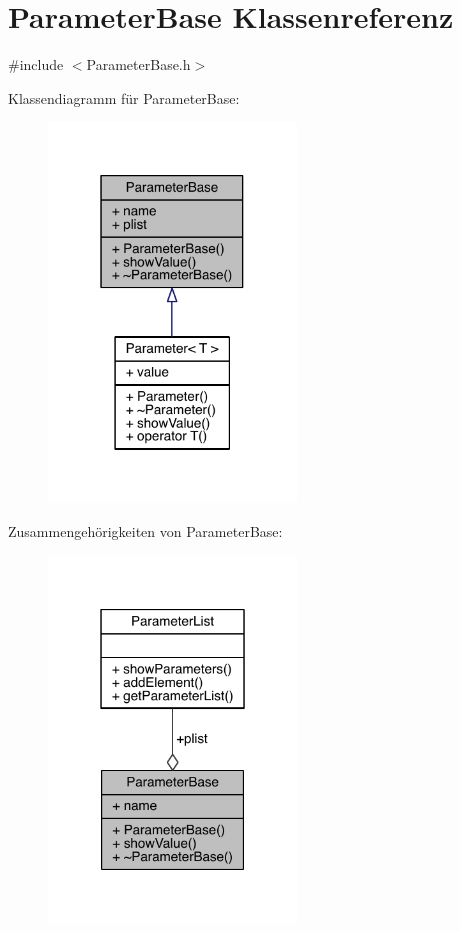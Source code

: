 \hypertarget{class_parameter_base}{}\section{Parameter\+Base Klassenreferenz}
\label{class_parameter_base}


{\ttfamily \#include $<$Parameter\+Base.\+h$>$}



Klassendiagramm für Parameter\+Base\+:\nopagebreak
\begin{figure}[H]
\begin{center}
\leavevmode
\includegraphics[width=187pt]{class_parameter_base__inherit__graph}
\end{center}
\end{figure}


Zusammengehörigkeiten von Parameter\+Base\+:\nopagebreak
\begin{figure}[H]
\begin{center}
\leavevmode
\includegraphics[width=187pt]{class_parameter_base__coll__graph}
\end{center}
\end{figure}
